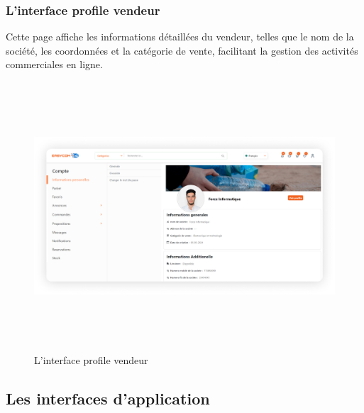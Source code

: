 \documentclass[edit,12pt,a4paper,ChapStyle,oneside,doubleinterligne]{report}
\begin{document}
\subsubsection{L'interface profile vendeur}
Cette page affiche les informations détaillées du vendeur, telles que le nom de la société, les coordonnées et la catégorie de vente, facilitant la gestion des activités commerciales en ligne.
  \begin{figure} [H]
    \centering
    \includegraphics[width = 15.319375cm , height = 10cm , angle=360]{images/profil vendeur.png}
    \caption{L'interface profile vendeur}
    \label{fig:profil vendeur}
\end{figure}



\subsection{Les interfaces d'application}
\end{document}
